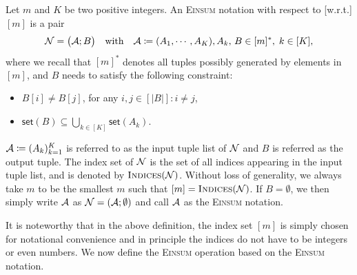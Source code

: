 \documentclass[letterpaper,11pt]{article}
\def\Einsum{\textsc{Einsum}}
\newcommand{\takesetp}[1]{\mathsf{set}(#1)}
\newcommand{\indexset}{\textsc{Indices}}
\begin{document}
\begin{bibunit}[plainnat]
\begin{definition}[\Einsum{} Notation]\label{def:tensor_expression}
Let $m$ and $K$ be two positive integers. An \Einsum{} notation with respect to [w.r.t.] $[m]$ is a pair
\begin{align*}
{\mathcal{N}} = \big({\mathcal{A}}; B\big) \quad \text{with} \quad {\mathcal{A}} \coloneqq (A_1, \cdots, A_K), A_k,\, B \in [m]^*, \; k \in [K],
\end{align*}
where we recall that $[m]^{\ast}$ denotes all tuples possibly generated by elements in $[m]$, and $B$ needs to satisfy the following constraint: 

\begin{itemize}
    \item $B[i] \neq B[j]$, for any $i, j \in [|B|]:i \neq j$, 
    \item $\takesetp{B} \subseteq \bigcup_{k \in [K]} \takesetp{A_k}$.
\end{itemize}
${\mathcal{A}} \coloneqq (A_k)_{k = 1}^{K}$ is referred to as the input tuple list of ${\mathcal{N}}$ and $B$ is referred as the output tuple. The index set of ${\mathcal{N}}$ is the set of all indices appearing in the input tuple list, and is denoted by $\indexset(\calN)$. Without loss of generality, we always take $m$ to be the smallest $m$ such that $[m] = \indexset(\calN)$. If $B = \emptyset$, we then simply write ${\mathcal{A}}$ as ${\mathcal{N}} = ({\mathcal{A}}; \emptyset)$ and call ${\mathcal{A}}$ as the \Einsum{} notation.
\end{definition}


It is noteworthy that in the above definition, the index set $[m]$ is simply chosen for notational convenience and in principle the indices do not have to be integers or even numbers. We now define the \Einsum{} operation based on the \Einsum{} notation.


\end{bibunit}
\end{document}
